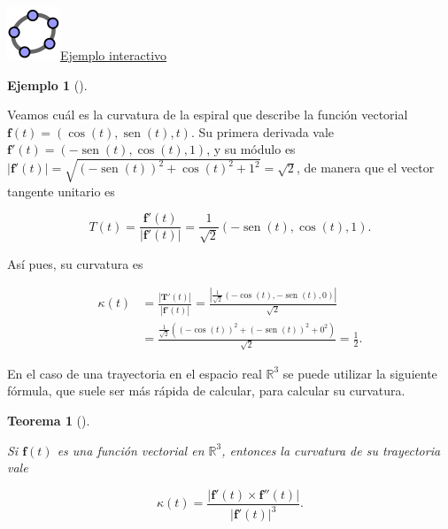 \documentclass[
  a4paper,
]{scrreport}
\theoremstyle{definition}
\newtheorem{example}{Ejemplo}[chapter]
\theoremstyle{plain}
\theoremstyle{definition}
\theoremstyle{definition}
\theoremstyle{plain}
\newtheorem{theorem}{Teorema}[chapter]
\theoremstyle{plain}
\theoremstyle{remark}
\begin{document}
\href{https://www.geogebra.org/m/gua3ycdj}{\includegraphics{img/logos/logo-geogebra.png}Ejemplo
interactivo}

\begin{example}[]\protect\hypertarget{exm-curvatura-trayectoria}{}\label{exm-curvatura-trayectoria}

Veamos cuál es la curvatura de la espiral que describe la función
vectorial \(\mathbf{f}(t)=(\cos(t),\operatorname{sen}(t),t)\). Su
primera derivada vale
\(\mathbf{f}'(t)=(-\operatorname{sen}(t),\cos(t),1)\), y su módulo es
\(|\mathbf{f}'(t)| = \sqrt{(-\operatorname{sen}(t))^2+\cos(t)^2+1^2} = \sqrt{2}\),
de manera que el vector tangente unitario es

\[
T(t) 
= \frac{\mathbf{f}'(t)}{|\mathbf{f}'(t)|}
= \frac{1}{\sqrt{2}}(-\operatorname{sen}(t),\cos(t),1).
\]

Así pues, su curvatura es

\begin{align*}
\kappa(t) 
&= \frac{|\mathbf{T}'(t)|}{|\mathbf{f}'(t)|}
= \frac{|\frac{1}{\sqrt{2}}(-\cos(t),-\operatorname{sen}(t), 0)|}{\sqrt{2}} \\
&= \frac{\frac{1}{\sqrt{2}}((-\cos(t))^2+(-\operatorname{sen}(t))^2+0^2)}{\sqrt{2}}
= \frac{1}{2}.
\end{align*}

\end{example}

En el caso de una trayectoria en el espacio real \(\mathbb{R}^3\) se
puede utilizar la siguiente fórmula, que suele ser más rápida de
calcular, para calcular su curvatura.

\begin{theorem}[]\protect\hypertarget{thm-curvatura-trayectoria-espacio-real}{}\label{thm-curvatura-trayectoria-espacio-real}

Si \(\mathbf{f}(t)\) es una función vectorial en \(\mathbb{R}^3\),
entonces la curvatura de su trayectoria vale

\[
\kappa(t) 
= \frac{|\mathbf{f}'(t)\times \mathbf{f}''(t)|}{|\mathbf{f}'(t)|^3}.
\]

\end{theorem}
\end{document}
